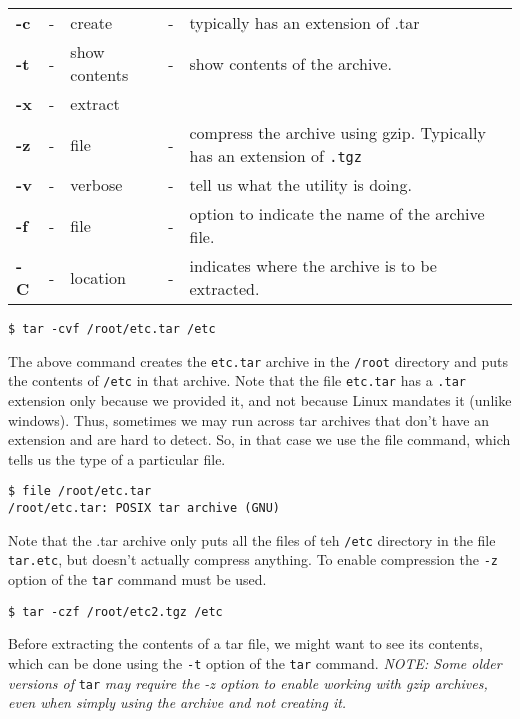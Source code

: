 \begin{tabular}{lclcl}
	\textbf{-c} &- &create &- &typically has an extension of .tar \\
	\textbf{-t} &- &show contents &- &show contents of the archive. \\
	\textbf{-x} &- &extract & & \\
	\textbf{-z} &- &file &- &compress the archive using gzip. Typically has an extension of \verb|.tgz| \\
	\textbf{-v} &- &verbose &- &tell us what the utility is doing. \\
	\textbf{-f} &- &file &- &option to indicate the name of the archive file. \\
	\textbf{-C} &- &location &- &indicates where the archive is to be extracted. \\		
\end{tabular}

\begin{verbatim}
$ tar -cvf /root/etc.tar /etc
\end{verbatim}

\noindent
The above command creates the \verb|etc.tar| archive in the \verb|/root| directory and puts the contents of \verb|/etc| in that archive. Note that the file \verb|etc.tar| has a \verb|.tar| extension only because we provided it, and not because Linux mandates it (unlike windows). Thus, sometimes we may run across tar archives that don't have an extension and are hard to detect. So, in that case we use the file command, which tells us the type of a particular file.

\begin{verbatim}
$ file /root/etc.tar
/root/etc.tar: POSIX tar archive (GNU)
\end{verbatim}

\noindent
Note that the .tar archive only puts all the files of teh \verb|/etc| directory in the file \verb|tar.etc|, but doesn't actually compress anything. To enable compression the \verb|-z| option of the \verb|tar| command must be used. 

\begin{verbatim}
$ tar -czf /root/etc2.tgz /etc
\end{verbatim}

\noindent
Before extracting the contents of a tar file, we might want to see its contents, which can be done using the \verb|-t| option of the \verb|tar| command. \textit{NOTE: Some older versions of} \verb|tar| \textit{may require the -z option to enable working with gzip archives, even when simply using the archive and not creating it.}

